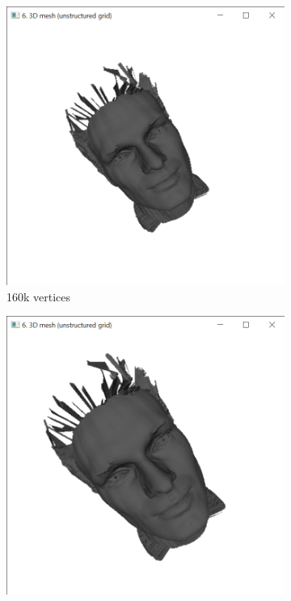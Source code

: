 \documentclass{bigdata}
\begin{document}
\begin{figure}[h!]
  \centering
  \begin{subfigure}[b]{0.3\linewidth}
    \includegraphics[width=\linewidth]{Pictures/preSub.png}
    \caption{160k vertices}
  \end{subfigure}
  \begin{subfigure}[b]{0.3\linewidth}
    \includegraphics[width=\linewidth]{Pictures/postSub.png}

\end{subfigure}
\end{figure}
\end{document}
